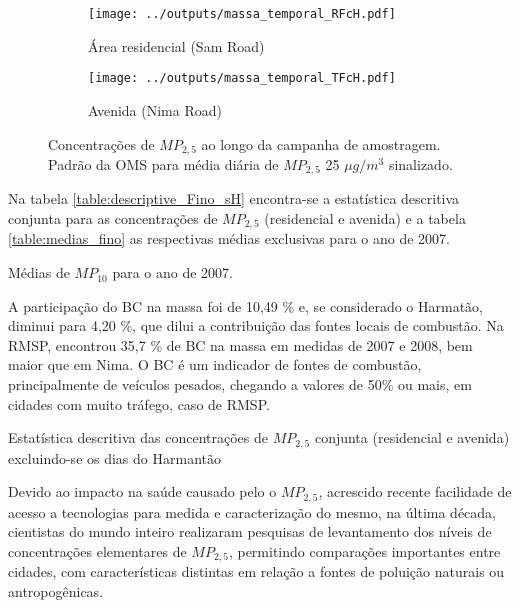 \begin{figure}[H]
  \centering
  \begin{subfigure}[b]{0.45\textwidth}
    \texttt{[image: ../outputs/massa\_temporal\_RFcH.pdf]}
    \caption{Área residencial (Sam Road)}
  \end{subfigure}%
  \begin{subfigure}[b]{0.45\textwidth}
    \texttt{[image: ../outputs/massa\_temporal\_TFcH.pdf]}
    \caption{Avenida (Nima Road)}
  \end{subfigure}
  \caption{Concentrações de $MP_{2,5}$ ao longo da campanha de amostragem. 
           Padrão da OMS para média diária de $MP_{2,5}$ 25 $\mu g/m^3$ sinalizado.
           \label{fig:massa_temporal_mp2.5}}
\end{figure}

Na tabela \ref{table:descriptive_Fino_sH} encontra-se a estatística 
descritiva conjunta para as concentrações de $MP_{2,5}$ (residencial e avenida)
e a tabela \ref{table:medias_fino} as respectivas médias exclusivas para o ano
de 2007.

\begin{table}[H]
  \centering
  
  \caption{Médias de $MP_{10}$ para o ano de 2007. \label{table:medias_fino}}
\end{table} 

A participação do BC na massa foi de 10,49 \% e, se considerado 
o Harmatão, diminui para 4,20 \%, que dilui a contribuição das fontes locais 
de combustão.
Na RMSP, \citet{andrade2012} encontrou 35,7 \% de BC na massa em medidas
de 2007 e 2008, bem maior que em Nima. O BC é um indicador de fontes de 
combustão, principalmente de veículos pesados, chegando a valores de 50\% ou 
mais, em cidades com muito tráfego, caso de RMSP.

\begin{table}[H]
  \centering
    
  \caption{Estatística descritiva das concentrações de $MP_{2,5}$ conjunta 
           (residencial e avenida) excluindo-se os dias do Harmantão
            \label{table:descriptive_Fino_sH}}
\end{table}

Devido ao impacto na saúde causado pelo o $MP_{2,5}$, acrescido recente facilidade 
 de acesso a tecnologias para medida e caracterização do mesmo, 
na última década, cientistas do mundo inteiro realizaram pesquisas de 
levantamento dos níveis de concentrações elementares de $MP_{2,5}$, permitindo
comparações importantes entre cidades, com características distintas em 
relação a fontes de poluição naturais ou antropogênicas.

